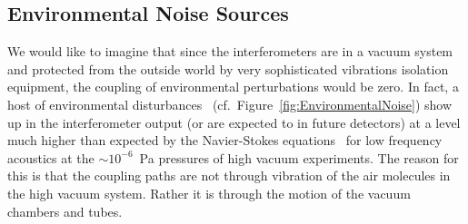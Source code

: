 






%


\subsection{Environmental Noise Sources}
\label{s:IDC:PEM}
We would like to imagine that since the interferometers are in a vacuum system and
protected from the outside world by very sophisticated vibrations
isolation equipment, the coupling of environmental perturbations would
be zero. In fact, a host of environmental
disturbances~\cite{Effler:2015hw, Acernese:2006dq}
(cf.~Figure~\ref{fig:EnvironmentalNoise}) show up in the
interferometer output (or are expected to in future detectors) at a
level much higher than expected by the Navier-Stokes
equations~\cite{Greenspan:sound} for low frequency acoustics at the
$\sim10^{-6}$~Pa pressures of high vacuum experiments. The reason for
this is that the coupling paths are not through vibration of the air
molecules in the high vacuum system. Rather it is through the motion of the vacuum chambers and tubes.

